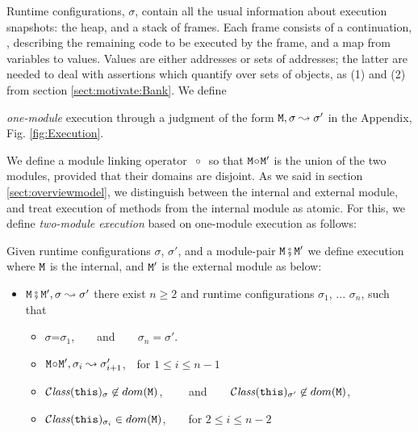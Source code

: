 Runtime configurations, $\sigma$,  contain   all the usual information about execution snapshots: the heap, and a
stack of frames. 
%
Each frame consists of a continuation, , describing the remaining code to be executed by the
frame, and a map from
variables to values. Values are either addresses or sets of addresses; the latter 
are needed to deal with assertions which quantify over sets of objects, as
\eg (1) and (2) from section \ref{sect:motivate:Bank}.
% 
We define {\emph{one-module} execution  through a judgment of the form ${\mbox{\tt{\ensuremath{{\mbox{\tt{M}}}}}}}, \sigma \leadsto \sigma'$ in the Appendix, Fig.  \ref{fig:Execution}. 
%
  

We define a module linking operator \  $\!\circ\!$ \  so that
${\mbox{\tt{\ensuremath{{\mbox{\tt{M}}}}}}}\!\circ\!{\mbox{\tt{\ensuremath{{\mbox{\tt{M}}}}}}}'$ is the union of the two modules, provided that their domains are disjoint.
As we said in section \ref{sect:overviewmodel}, we distinguish  between the internal and external module, and treat  execution of 
methods from the internal module as atomic. For this, we define \emph{two-module execution}  based on
one-module execution as follows:

\begin{definition}
\label{def:execution:internal:external}
\label{def:module_pair_execution} 
Given runtime configurations $\sigma$,  $\sigma'$,  and a module-pair ${\mbox{\tt{\ensuremath{{\mbox{\tt{M}}}}}}} \fatsemi {\mbox{\tt{\ensuremath{{\mbox{\tt{M}}}}}}}'$ we define
execution where ${\mbox{\tt{\ensuremath{{\mbox{\tt{M}}}}}}}$ is the internal, and ${\mbox{\tt{\ensuremath{{\mbox{\tt{M}}}}}}}'$ is the external module as below:
 
\begin{itemize}
\item
${\mbox{\tt{\ensuremath{{\mbox{\tt{M}}}}}}} \fatsemi {\mbox{\tt{\ensuremath{{\mbox{\tt{M}}}}}}}', \sigma \leadsto \sigma'$ \IFF
there exist  $n\geq 2$ and runtime configurations $\sigma_1$,  ...
$\sigma_n$, such that
\begin{itemize}
\item
$\sigma$=$\sigma_1$,\ \  \ \ and\ \ \ \ $\sigma_n=\sigma'$.
\item
${\mbox{\tt{\ensuremath{{\mbox{\tt{M}}}}}}} \!\circ\! {\mbox{\tt{\ensuremath{{\mbox{\tt{M}}}}}}}', \sigma_i \leadsto \sigma_{i+1}'$,\  \  for $1\leq i \leq n\!-\!1$
\item
${\mathcal C}{\mathit{lass}}({\mbox{\tt{this}}})_{\sigma}\not\in dom({{\mbox{\tt{\ensuremath{{\mbox{\tt{M}}}}}}}})$,  \ \  \ \ and\ \ \ \
${\mathcal C}{\mathit{lass}}({\mbox{\tt{this}}})_{\sigma'} \not\in dom({{\mbox{\tt{\ensuremath{{\mbox{\tt{M}}}}}}}})$,
\item
 ${\mathcal C}{\mathit{lass}}({\mbox{\tt{this}}})_{\sigma_i} \in dom({{\mbox{\tt{\ensuremath{{\mbox{\tt{M}}}}}}}})$,\ \ \ \ for $2\leq i \leq n\!-\!2$
\end{itemize}
\end{itemize}


\end{definition}}
